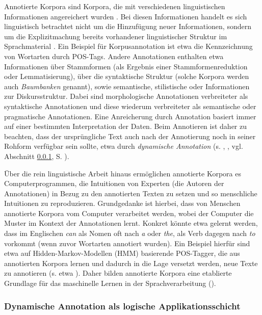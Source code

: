 \documentclass[abstracton, 12pt]{scrartcl}
\begin{document}
Annotierte Korpora sind Korpora, die mit verschiedenen linguistischen Informationen angereichert wurden \citep[24]{McEneryAndWilson1996}. Bei diesen Informationen handelt es sich linguistisch betrachtet nicht um die Hinzufügung neuer Informationen, sondern um die Explizitmachung bereits vorhandener linguistischer Struktur im Sprachmaterial \citep[453]{McEnery2003}. Ein Beispiel für Korpusannotation ist etwa die Kennzeichnung von Wortarten durch POS-Tags. Andere Annotationen enthalten etwa Informationen über Stammformen (als Ergebnis einer Stammformenreduktion oder Lemmatisierung), über die syntaktische Struktur (solche Korpora werden auch \emph{Baumbanken} genannt), sowie semantische, stilistische oder Informationen zur Diskursstruktur. Dabei sind morphologische Annotationen verbreiteter als syntaktische Annotationen und diese wiederum verbreiteter als semantische oder pragmatische Annotationen. Eine Anreicherung durch Annotation basiert immer auf einer bestimmten Interpretation der Daten. Beim Annotieren ist daher zu beachten, dass der ursprüngliche Text auch nach der Annotierung noch in seiner Rohform verfügbar sein sollte, etwa durch \emph{dynamische Annotation} (s. \citealt{BendenAndHermes2004}, \citealt{HermesAndBenden2005}, vgl. Abschnitt \ref{dynamische-annotation}, S. \pageref{dynamische-annotation}).

Über die rein linguistische Arbeit hinaus ermöglichen annotierte Korpora es Computerprogrammen, die Intuitionen von Experten (die Autoren der Annotationen) in Bezug zu den annotierten Texten zu setzen und so menschliche Intuitionen zu reproduzieren. Grundgedanke ist hierbei, dass von Menschen annotierte Korpora vom Computer verarbeitet werden, wobei der Computer die Muster im Kontext der Annotationen lernt. Konkret könnte etwa gelernt werden, dass im Englischen \emph{can} als Nomen oft nach \emph{a} oder \emph{the}, als Verb dagegen nach \emph{to} vorkommt (wenn zuvor Wortarten annotiert wurden). Ein Beispiel hierfür sind etwa auf Hidden-Markov-Modellen (HMM) basierende POS-Tagger, die aus annotierten Korpora lernen und dadurch in die Lage versetzt werden, neue Texte zu annotieren (s. etwa \citealt{ManningAndSchuetze1999}). Daher bilden annotierte Korpora eine etablierte Grundlage für das maschinelle Lernen in der Sprachverarbeitung (\citealt[459]{McEnery2003}).

\subsubsection{Dynamische Annotation als logische Applikationsschicht} \label{dynamische-annotation}
\end{document}
